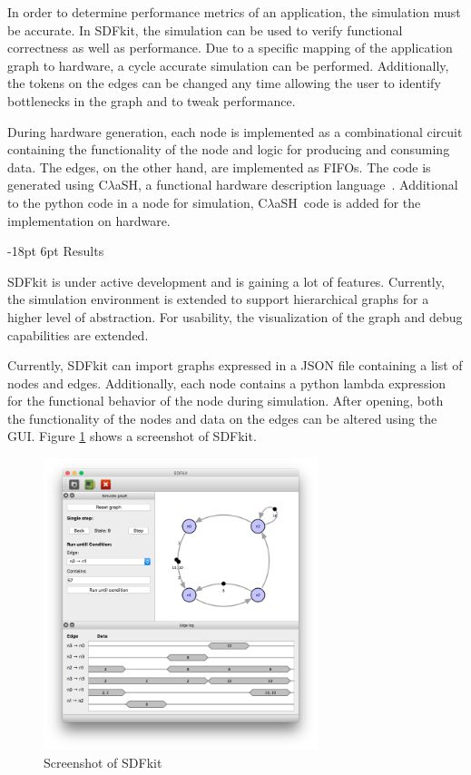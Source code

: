 \makeatother\documentclass[10pt,english,oneside,twocolumn,a4paper]{article}%
\makeatletter
\newcommand{\clash}{C$\lambda$aSH}
\renewcommand\section{\@startsection {section}{1}{\z@}%
                                   {-18pt}%
                                   {6pt}%
                                   {\Large\bfseries\RaggedRight}}
\makeatother
\begin{document}
  In order to determine performance metrics of an application, the simulation must be accurate.
  In SDFkit, the simulation can be used to verify functional correctness as well as performance.
  Due to a specific mapping of the application graph to hardware, a cycle accurate simulation can be performed.
  Additionally, the tokens on the edges can be changed any time allowing the user to identify bottlenecks in the graph and to tweak performance.
  
  During hardware generation, each node is implemented as a combinational circuit containing the functionality of the node and logic for producing and consuming data.
  The edges, on the other hand, are implemented as FIFOs.
  The code is generated using \clash, a functional hardware description language~\cite{Baaij10}.
  Additional to the python code in a node for simulation, \clash\ code is added for the implementation on hardware.


\section{Results}
\label{sec:results}

  SDFkit is under active development and is gaining a lot of features.
  Currently, the simulation environment is extended to support hierarchical graphs for a higher level of abstraction.
  For usability, the visualization of the graph and debug capabilities are extended.

  Currently, SDFkit can import graphs expressed in a JSON file containing a list of nodes and edges.
  Additionally, each node contains a python lambda expression for the functional behavior of the node during simulation.
  After opening, both the functionality of the nodes and data on the edges can be altered using the GUI.
  Figure \ref{fig:screenshot} shows a screenshot of SDFkit.

  \begin{figure}[h!]
    \centering
    \includegraphics[width=80mm]{screenshot.png}
    \caption{Screenshot of SDFkit}
    \label{fig:screenshot}
  \end{figure}
\end{document}
